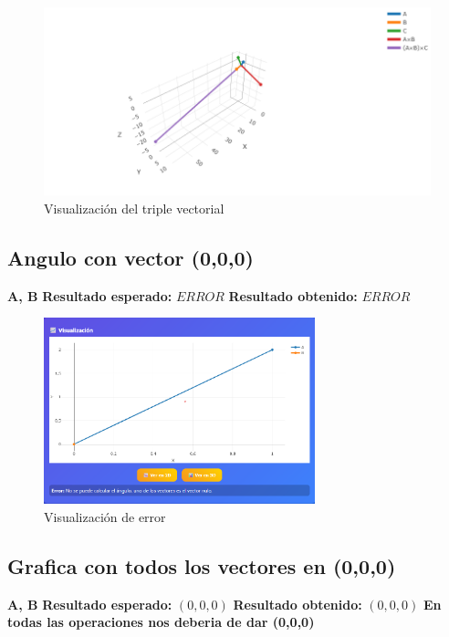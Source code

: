 \documentclass[12pt,a4paper]{article}
\begin{document}
\begin{figure}[H]
    \centering
    \includegraphics[width=1\textwidth]{imagenes/triple_vectorial2.png} %
    \caption{Visualización del triple vectorial}
\end{figure}

\subsection{Angulo con vector (0,0,0)}
\textbf{A, B}  
\textbf{Resultado esperado:} $ERROR$  
\textbf{Resultado obtenido:} $ERROR$  

\begin{figure}[H]
    \centering
    \includegraphics[width=0.7\textwidth]{imagenes/error.png} %
    \caption{Visualización de error}
\end{figure}

\subsection{Grafica con todos los vectores en (0,0,0)}
\textbf{A, B}  
\textbf{Resultado esperado:} $(0,0,0)$  
\textbf{Resultado obtenido:} $(0,0,0)$  
\textbf{En todas las operaciones nos deberia de dar (0,0,0)}
\end{document}
